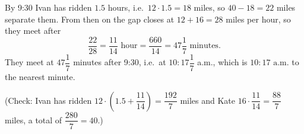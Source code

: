 By 9:30 Ivan has ridden $1.5$ hours, i.e.\ $12\cdot1.5=18$ miles, so $40-18=22$ miles separate them. From then on the gap closes at $12+16=28$ miles per hour, so they meet after
\[
\dfrac{22}{28}=\dfrac{11}{14}\text{ hour}=\dfrac{660}{14}=47\dfrac{1}{7}\text{ minutes}.
\]
They meet at $47\dfrac{1}{7}$ minutes after 9:30, i.e.\ at $10{:}17\dfrac{1}{7}$ a.m., which is $\boxed{10{:}17\text{ a.m.}}$ to the nearest minute.

(Check: Ivan has ridden $12\cdot\left(1.5+\dfrac{11}{14}\right)=\dfrac{192}{7}$ miles and Kate $16\cdot\dfrac{11}{14}=\dfrac{88}{7}$ miles, a total of $\dfrac{280}{7}=40$.)
